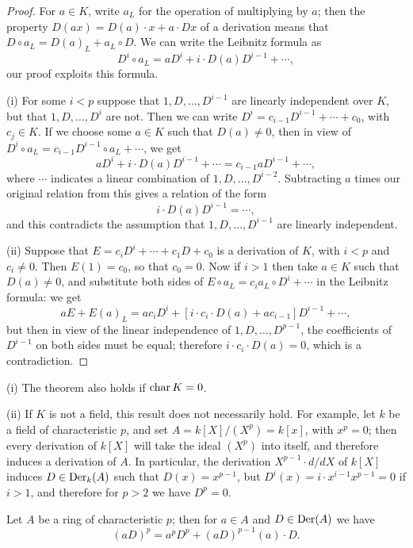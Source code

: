 \begin{proof}
For $a \in K$, write $a_L$ for the operation of multiplying by $a$; then the property
$D(ax) = D(a) \cdot x + a \cdot Dx$ of a derivation means that $D \circ a_L = D(a)_L + a_L \circ D$.
We can write the Leibnitz formula as
\[
  D^i \circ a_L = aD^i + i \cdot D(a)D^{i-1} + \cdots,
\]
our proof exploits this formula.

(i) For some $i < p$ suppose that $1, D, \ldots, D^{i-1}$ are linearly independent
over $K$, but that $1, D, \ldots, D^i$ are not. Then we can write
$D^i = c_{i-1}D^{i-1} + \cdots + c_0$, with $c_j \in K$. If we choose some $a \in K$ such that
$D(a) \ne 0$, then in view of $D^i \circ a_L = c_{i-1}D^{i-1} \circ a_L + \cdots$, we get
\[
  aD^i + i \cdot D(a)D^{i-1} + \cdots = c_{i-1}aD^{i-1} + \cdots,
\]
where $\cdots$ indicates a linear combination of $1, D, \ldots, D^{i-2}$. Subtracting $a$
times our original relation from this gives a relation of the form
\[
  i \cdot D(a)D^{i-1} = \cdots,
\]
and this contradicts the assumption that $1, D, \ldots, D^{i-1}$ are linearly
independent.

(ii) Suppose that $E = c_iD^i + \cdots + c_1D + c_0$ is a derivation of $K$, with $i < p$
and $c_i \ne 0$. Then $E(1) = c_0$, so that $c_0 = 0$. Now if $i > 1$ then take $a \in K$
such that $D(a) \ne 0$, and substitute both sides of $E \circ a_L = c_i a_L \circ D^i + \cdots$ in the
Leibnitz formula: we get
\[
  aE + E(a)_L = ac_iD^i + [i \cdot c_i \cdot D(a) + ac_{i-1}]D^{i-1} + \cdots,
\]
but then in view of the linear independence of $1, D, \ldots, D^{p-1}$, the coefficients
of $D^{i-1}$ on both sides must be equal; therefore $i \cdot c_i \cdot D(a) = 0$, which is a
contradiction.
\end{proof}

\begin{remarks}
(i) The theorem also holds if $\operatorname{char} K = 0$.

(ii) If $K$ is not a field, this result does not necessarily hold. For example, let
$k$ be a field of characteristic $p$, and set $A = k[X]/(X^p) = k[x]$, with
$x^p = 0$; then every derivation of $k[X]$ will take the ideal $(X^p)$ into itself,
and therefore induces a derivation of $A$. In particular, the derivation
$X^{p-1} \cdot d/dX$ of $k[X]$ induces $D \in \operatorname{Der}_k(A)$ such that $D(x) = x^{p-1}$, but
$D^i(x) = i \cdot x^{i-1}x^{p-1} = 0$ if $i > 1$, and therefore for $p > 2$ we have $D^p = 0$.
\end{remarks}

\begin{theorem}\label{thm:25.5}
Let $A$ be a ring of characteristic $p$; then for $a \in A$ and $D \in \operatorname{Der}(A)$ we have
\[
  (aD)^p = a^pD^p + (aD)^{p-1}(a) \cdot D.
\]
\end{theorem}

